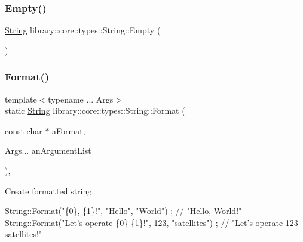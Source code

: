 \subsubsection{\texorpdfstring{Empty()}{Empty()}}
{\footnotesize\ttfamily \hyperlink{classlibrary_1_1core_1_1types_1_1_string}{String} library\+::core\+::types\+::\+String\+::\+Empty (\begin{DoxyParamCaption}{ }\end{DoxyParamCaption})\hspace{0.3cm}{\ttfamily [static]}}

\mbox{\label{classlibrary_1_1core_1_1types_1_1_string_ae1745f54be6952d7b5a388239377b287}} 
\subsubsection{\texorpdfstring{Format()}{Format()}}
{\footnotesize\ttfamily template$<$typename ... Args$>$ \\
static \hyperlink{classlibrary_1_1core_1_1types_1_1_string}{String} library\+::core\+::types\+::\+String\+::\+Format (\begin{DoxyParamCaption}\item[{const char $\ast$}]{a\+Format,  }\item[{Args...}]{an\+Argument\+List }\end{DoxyParamCaption})\hspace{0.3cm}{\ttfamily [inline]}, {\ttfamily [static]}}



Create formatted string. 


\begin{DoxyCode}
\hyperlink{classlibrary_1_1core_1_1types_1_1_string_ae1745f54be6952d7b5a388239377b287}{String::Format}(\textcolor{stringliteral}{"\{0\}, \{1\}!"}, \textcolor{stringliteral}{"Hello"}, \textcolor{stringliteral}{"World"}) ; \textcolor{comment}{// "Hello, World!"}
\hyperlink{classlibrary_1_1core_1_1types_1_1_string_ae1745f54be6952d7b5a388239377b287}{String::Format}(\textcolor{stringliteral}{"Let's operate \{0\} \{1\}!"}, 123, \textcolor{stringliteral}{"satellites"}) ; \textcolor{comment}{// "Let's operate 123
       satellites!"}
\end{DoxyCode}



